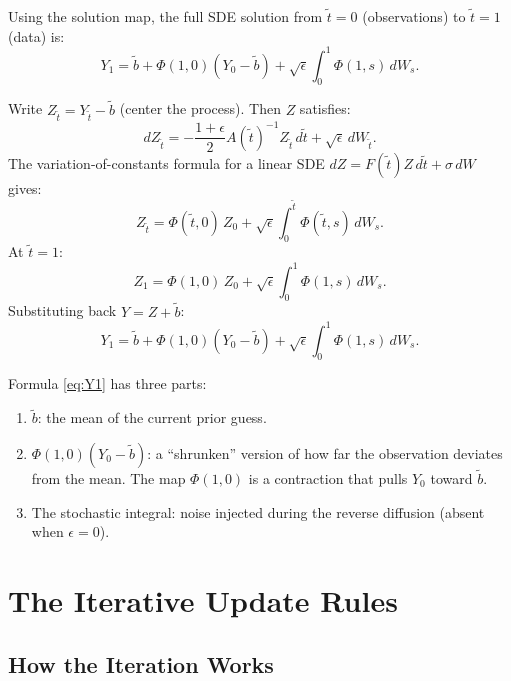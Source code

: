 \documentclass[11pt, a4paper]{article}
\theoremstyle{definition}
\begin{document}
Using the solution map, the full SDE solution from $\tilde{t}=0$ (observations) to $\tilde{t}=1$ (data) is:
\begin{equation}\label{eq:Y1}
    Y_1 = \tilde{b} + \Phi(1,0)(Y_0 - \tilde{b}) + \sqrt{\epsilon}\int_0^1 \Phi(1,s)\,dW_s.
\end{equation}

\begin{calculation}[title={Deriving Eq.~\eqref{eq:Y1} by variation of constants}]
Write $Z_{\tilde{t}} = Y_{\tilde{t}} - \tilde{b}$ (center the process). Then $Z$ satisfies:
\[
    dZ_{\tilde{t}} = -\frac{1+\epsilon}{2}A(\tilde{t})^{-1}Z_{\tilde{t}}\,d\tilde{t} + \sqrt{\epsilon}\,dW_{\tilde{t}}.
\]
The variation-of-constants formula for a linear SDE $dZ = F(\tilde{t})Z\,d\tilde{t} + \sigma\,dW$ gives:
\[
    Z_{\tilde{t}} = \Phi(\tilde{t},0)\,Z_0 + \sqrt{\epsilon}\int_0^{\tilde{t}} \Phi(\tilde{t},s)\,dW_s.
\]
At $\tilde{t}=1$:
\[
    Z_1 = \Phi(1,0)\,Z_0 + \sqrt{\epsilon}\int_0^1\Phi(1,s)\,dW_s.
\]
Substituting back $Y = Z + \tilde{b}$:
\[
    Y_1 = \tilde{b} + \Phi(1,0)(Y_0 - \tilde{b}) + \sqrt{\epsilon}\int_0^1\Phi(1,s)\,dW_s.
\]
\end{calculation}

\begin{intuition}
Formula \eqref{eq:Y1} has three parts:
\begin{enumerate}
    \item $\tilde{b}$: the mean of the current prior guess.
    \item $\Phi(1,0)(Y_0 - \tilde{b})$: a ``shrunken'' version of how far the observation deviates from the mean. The map $\Phi(1,0)$ is a contraction that pulls $Y_0$ toward $\tilde{b}$.
    \item The stochastic integral: noise injected during the reverse diffusion (absent when $\epsilon = 0$).
\end{enumerate}
\end{intuition}

\section{The Iterative Update Rules}

\subsection{How the Iteration Works}
\end{document}
